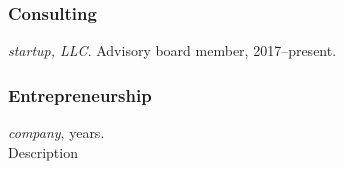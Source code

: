     \subsubsection{Consulting}
    \label{subsec:consultant}
        \begin{subnum}
            \item   \mark \textit{startup, LLC}. Advisory board member, 2017--present.
        \end{subnum}

    \subsubsection{Entrepreneurship}
    \label{subsec:entrepreneur}
        \begin{subnum}
            \item \textit{company}, years.\\ Description

        \end{subnum}
